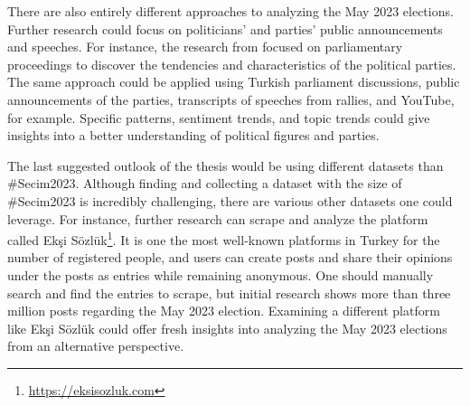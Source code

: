 There are also entirely different approaches to analyzing the May 2023 elections. Further research 
could focus on politicians' and parties' public announcements and speeches. For instance, the 
research from \textcite{contreras_panama_lda_bertopic_2022} focused on parliamentary proceedings to 
discover the tendencies and characteristics of the political parties. The same approach could be 
applied using Turkish parliament discussions, public announcements of the parties, transcripts of 
speeches from rallies, and YouTube, for example. Specific patterns, sentiment trends, and topic 
trends could give insights into a better understanding of political figures and parties.

The last suggested outlook of the thesis would be using different datasets than \#Secim2023. 
Although finding and collecting a dataset with the size of \#Secim2023 is incredibly challenging, 
there are various other datasets one could leverage. For instance, further research can scrape and 
analyze the platform called Ekşi Sözlük\footnote{\url{https://eksisozluk.com}}. It is one the most 
well-known platforms in Turkey for the number of registered people, and users can create posts and 
share their opinions under the posts as entries while remaining anonymous. One should manually 
search and find the entries to scrape, but initial research shows more than three million posts 
regarding the May 2023 election. Examining a different platform  like Ekşi Sözlük could offer fresh 
insights into analyzing the May 2023 elections from an alternative perspective.
